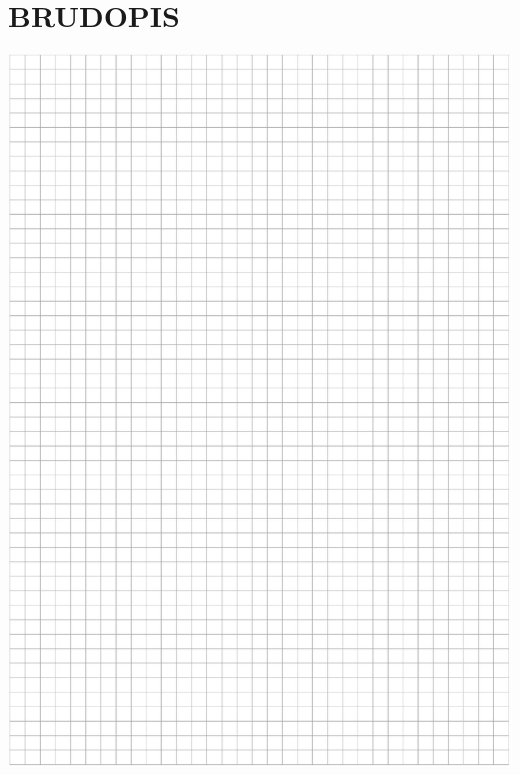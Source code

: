 \documentclass[10pt]{article}
\begin{document}
\section*{BRUDOPIS}
\includegraphics[max width=\textwidth, center]{2024_11_21_12a27a32a51fef2c834ag-15}\\
\end{document}
